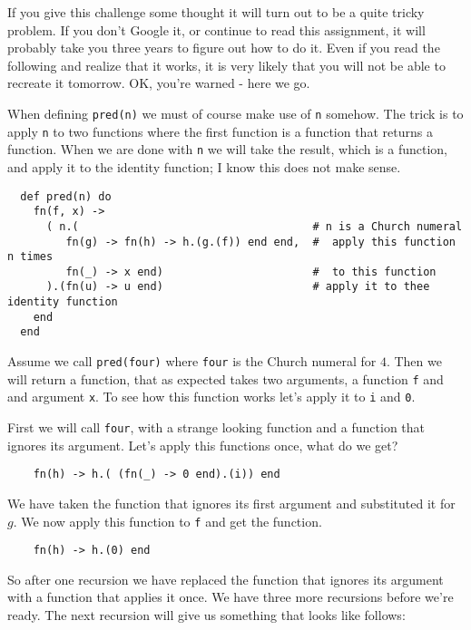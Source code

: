 \documentclass[a4paper,11pt]{article}
\begin{document}
If you give this challenge some thought it will turn out to be a quite
tricky problem. If you don't Google it, or continue to read this
assignment, it will probably take you three years to figure out how to
do it. Even if you read the following and realize that it works, it is
very likely that you will not be able to recreate it tomorrow. OK,
you're warned - here we go.

When defining {\tt pred(n)} we must of course make use of {\tt n}
somehow. The trick is to apply {\tt n} to two functions where the
first function is a function that returns a function. When we are done
with {\tt n} we will take the result, which is a function, and apply it
to the identity function; I know this does not make sense. 

\begin{verbatim}
  def pred(n) do
    fn(f, x) ->
      ( n.(                                    # n is a Church numeral
         fn(g) -> fn(h) -> h.(g.(f)) end end,  #  apply this function n times 
         fn(_) -> x end)                       #  to this function 
      ).(fn(u) -> u end)                       # apply it to thee identity function
    end
  end
\end{verbatim}

Assume we call {\tt pred(four)} where {\tt four} is the Church numeral
for $4$. Then we will return a function, that as expected takes two
arguments, a function {\tt f} and and argument {\tt x}. To see how
this function works let's apply it to {\tt i} and {\tt 0}.

First we will call {\tt four}, with a strange looking function and a
function that ignores its argument. Let's apply this functions once,
what do we get?

\begin{verbatim}
    fn(h) -> h.( (fn(_) -> 0 end).(i)) end 
\end{verbatim}

We have taken the function that ignores its first argument and
substituted it for $g$. We now apply this function to {\tt f} and get
the function.

\begin{verbatim}
    fn(h) -> h.(0) end
\end{verbatim}

So after one recursion we have replaced the function that ignores its
argument with a function that applies it once.  We have three more
recursions before we're ready. The next recursion will give us
something that looks like follows:
\end{document}

